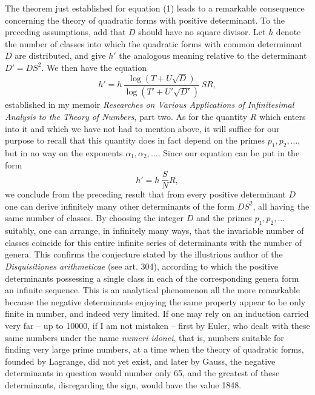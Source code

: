 \documentclass[11pt]{article}
\begin{document}
The theorem just established for equation (1) leads to a remarkable consequence concerning the theory of quadratic forms with positive determinant. To the preceding assumptions, add that \(D\) should have no square divisor. Let \(h\) denote the number of classes into which the quadratic forms with common determinant \(D\) are distributed, and give \(h'\) the analogous meaning relative to the determinant \(D'=DS^2\). We then have the equation
\[
h'=h\,\frac{\log(T+U\sqrt D)}{\log(T'+U'\sqrt{D'})}\,SR,
\]
established in my memoir \textit{Researches on Various Applications of Infinitesimal Analysis to the Theory of Numbers}, part two. As for the quantity \(R\) which enters into it and which we have not had to mention above, it will suffice for our purpose to recall that this quantity does in fact depend on the primes \(p_1,p_2,\ldots\), but in no way on the exponents \(\alpha_1,\alpha_2,\ldots\). Since our equation can be put in the form
\[
h'=h\,\frac{S}{N}R,
\]
we conclude from the preceding result that from every positive determinant \(D\) one can derive infinitely many other determinants of the form \(DS^2\), all having the same number of classes. By choosing the integer \(D\) and the primes \(p_1,p_2,\ldots\) suitably, one can arrange, in infinitely many ways, that the invariable number of classes coincide for this entire infinite series of determinants with the number of genera. This confirms the conjecture stated by the illustrious author of the \textit{Disquisitiones arithmeticae} (see art. 304), according to which the positive determinants possessing a single class in each of the corresponding genera form an infinite sequence. This is an analytical phenomenon all the more remarkable because the negative determinants enjoying the same property appear to be only finite in number, and indeed very limited. If one may rely on an induction carried very far -- up to 10000, if I am not mistaken -- first by Euler, who dealt with these same numbers under the name \textit{numeri idonei}, that is, numbers suitable for finding very large prime numbers, at a time when the theory of quadratic forms, founded by Lagrange, did not yet exist, and later by Gauss, the negative determinants in question would number only 65, and the greatest of these determinants, disregarding the sign, would have the value 1848.
\end{document}
